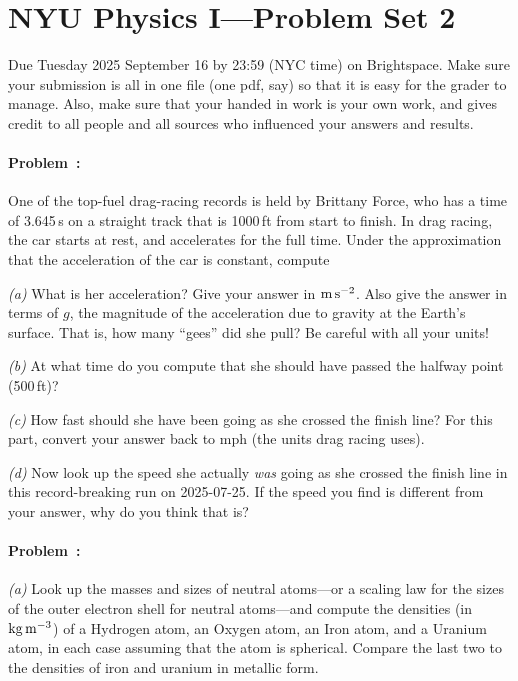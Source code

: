 \documentclass[12pt]{article}
\begin{document}
\section*{NYU Physics I---Problem Set 2}

Due Tuesday 2025 September 16 by 23:59 (NYC time) on Brightspace. Make sure
your submission is all in one file (one pdf, say) so that it is easy for
the grader to manage. Also, make sure that your handed in work is your
own work, and gives credit to all people and all sources who influenced
your answers and results.

\paragraph{Problem~\theproblem:}%
One of the top-fuel drag-racing records is held by Brittany Force, who has a
time of 3.645\,s on a straight track that is 1000\,ft from start to finish.
In drag racing, the car starts at rest, and accelerates for the full time.
Under the approximation that the acceleration of the car is constant, compute

\textsl{(a)} What is her acceleration? Give your answer in $\mathrm{m}\,\mathrm{s}^{-2}$.
Also give the answer in terms of $g$, the magnitude of the acceleration due
to gravity at the Earth's surface. That is, how many ``gees'' did she pull?
Be careful with all your units!

\textsl{(b)} At what time do you compute that she should have passed the halfway point (500\,ft)?

\textsl{(c)} How fast should she have been going as she crossed the finish line?
For this part, convert your answer back to mph (the units drag racing uses).

\textsl{(d)} Now look up the speed she actually \emph{was} going as she crossed
the finish line in this record-breaking run on 2025-07-25.
If the speed you find is different from your answer, why do you think that is?

\paragraph{Problem~\theproblem:}%
\textsl{(a)} Look up the masses and sizes of neutral atoms---or a
scaling law for the sizes of the outer electron shell for neutral
atoms---and compute the densities (in $\mathrm{kg}\,\mathrm{m}^{-3}$) of a Hydrogen
atom, an Oxygen atom, an Iron atom, and a Uranium atom, in each case
assuming that the atom is spherical. Compare the
last two to the densities of iron and uranium in metallic form.
\end{document}
